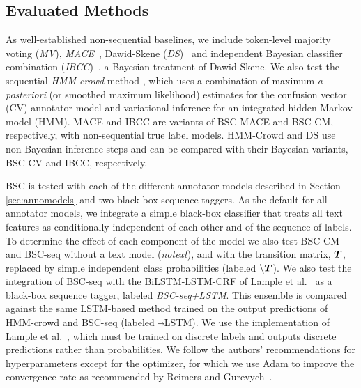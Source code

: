
\subsection{Evaluated Methods}
As well-established non-sequential baselines, we include token-level majority voting (\emph{MV}), \emph{MACE}~\cite{hovy2013learning}, Dawid-Skene (\emph{DS})~\cite{dawid_maximum_1979} and independent Bayesian classifier combination (\emph{IBCC})~\cite{kim2012bayesian}, a Bayesian treatment of Dawid-Skene. 
We also test the sequential \emph{HMM-crowd} method \cite{nguyen2017aggregating}, which uses a combination of 
maximum \emph{a posteriori} (or smoothed maximum likelihood) estimates for the confusion vector (CV) annotator model 
and variational inference for an integrated hidden Markov model (HMM). 
MACE and IBCC are variants of BSC-MACE and BSC-CM, respectively, with non-sequential true label models.
HMM-Crowd and DS use non-Bayesian inference steps and can be compared with
their Bayesian variants, BSC-CV and IBCC, respectively. 

BSC is tested with each of the different annotator models described in Section \ref{sec:annomodels} and 
 two black box sequence taggers. 
As the default for all annotator models, 
we integrate a simple black-box classifier
that treats all text features as conditionally independent of each other and of the sequence of labels. 
To determine the effect of each component of the model we also test BSC-CM 
and BSC-seq without a text model (\emph{notext}), 
and with the transition matrix, $\boldsymbol T$, replaced by simple independent class probabilities (labeled $\backslash \boldsymbol T$).
We also test the integration of BSC-seq with 
the BiLSTM-LSTM-CRF of Lample et al.~ as a black-box sequence tagger, labeled \emph{BSC-seq+LSTM}.
This ensemble is compared against the same LSTM-based method trained on the output predictions of HMM-crowd and BSC-seq (labeled $\Arrow{0.2cm}$LSTM).
We use the implementation of Lample et al.~, which
must be trained on discrete labels and outputs discrete predictions rather than probabilities.
We follow the authors' recommendations for hyperparameters except for the optimizer, 
for which we use Adam to improve the convergence rate as recommended by Reimers and Gurevych~.

